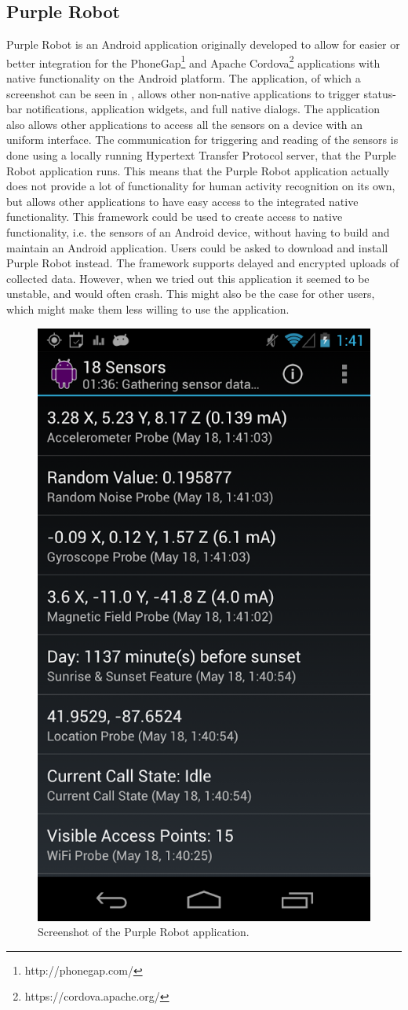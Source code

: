 \subsection{Purple Robot}
\label{sub:purple_robot} 
Purple Robot \parencite{purple_robot} is an Android application originally developed to allow for easier or better integration for the PhoneGap\footnote{http://phonegap.com/} and Apache Cordova\footnote{https://cordova.apache.org/} applications with native functionality on the Android platform. The application, of which a screenshot can be seen in , allows other non-native applications to trigger status-bar notifications, application widgets, and full native dialogs. The application also allows other applications to access all the sensors on a device with an uniform interface. The communication for triggering and reading of the sensors is done using a locally running Hypertext Transfer Protocol server, that the Purple Robot application runs. This means that the Purple Robot application actually does not provide a lot of functionality for human activity recognition on its own, but allows other applications to have easy access to the integrated native functionality. This framework could be used to create access to native functionality, i.e. the sensors of an Android device, without having to build and maintain an Android application. Users could be asked to download and install Purple Robot instead. The framework supports delayed and encrypted uploads of collected data. However, when we tried out this application it seemed to be unstable, and would often crash. This might also be the case for other users, which might make them less willing to use the application.

\begin{figure}[!htbp]
	\centering
	\includegraphics[height=0.5\textwidth]{graphic/existing_solutions/purple_robot.png}
	\caption[]{Screenshot of the Purple Robot application\parencite{purple_robot_google_play_store}.}
	\label{fig:purple_robot_screenshot}
\end{figure}
\FloatBarrier

